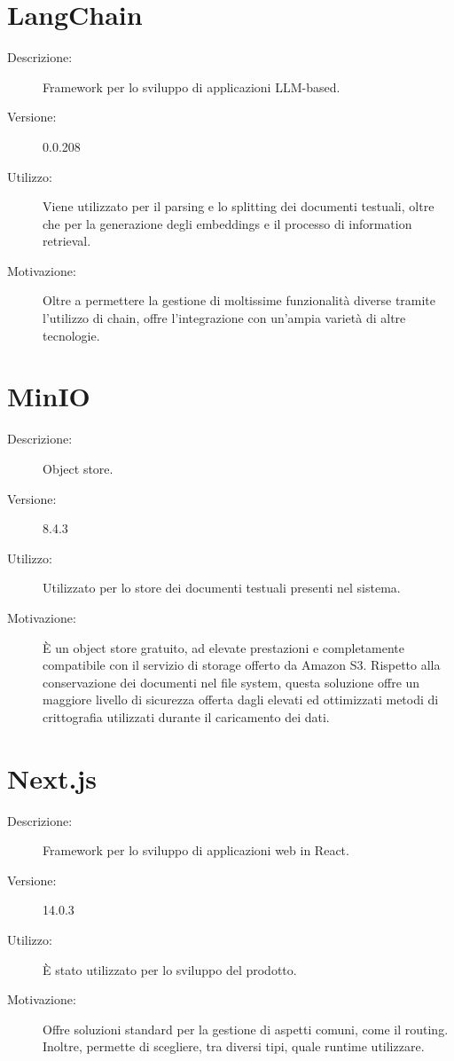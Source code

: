 \section{LangChain}
\begin{description}
\item[Descrizione:] Framework per lo sviluppo di applicazioni LLM-based.
\item[Versione:] 0.0.208
\item[Utilizzo:] Viene utilizzato per il parsing e lo splitting dei documenti testuali, oltre che per la generazione degli embeddings e il processo di information retrieval. 
\item[Motivazione:] Oltre a permettere la gestione di moltissime funzionalità diverse tramite l'utilizzo di chain, offre l'integrazione con un'ampia varietà di altre tecnologie. 
\end{description}

\section{MinIO}
\begin{description}
\item[Descrizione:] Object store.
\item[Versione:] 8.4.3
\item[Utilizzo:] Utilizzato per lo store dei documenti testuali presenti nel sistema.
\item[Motivazione:] È un object store gratuito, ad elevate prestazioni e completamente compatibile con il servizio di storage offerto da Amazon S3. Rispetto alla conservazione dei documenti nel file system, questa soluzione offre un maggiore livello di sicurezza offerta dagli elevati ed ottimizzati metodi di crittografia utilizzati durante il caricamento dei dati.
\end{description}

\section{Next.js}
\begin{description}
\item[Descrizione:] Framework per lo sviluppo di applicazioni web in React.
\item[Versione:] 14.0.3
\item[Utilizzo:] È stato utilizzato per lo sviluppo del prodotto.
\item[Motivazione:] Offre soluzioni standard per la gestione di aspetti comuni, come il routing. Inoltre, permette di scegliere, tra diversi tipi, quale runtime utilizzare.
\end{description}


